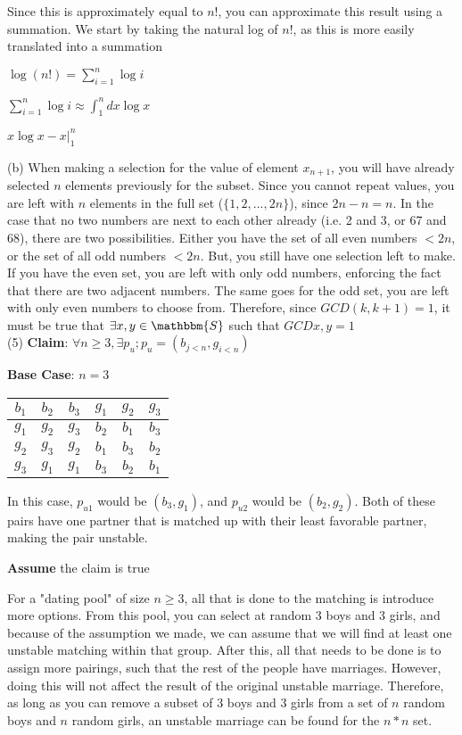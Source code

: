 \documentclass[]{article}
\begin{document}
Since this is approximately equal to $n!$, you can approximate this result using a summation.
We start by taking the natural log of $n!$, as this is more easily translated into a summation

$\log(n!) = \sum_{i = 1}^{n}{\log i}$

$\sum_{i = 1}^{n}{\log i} \approx \int_{1}^{n}{dx \log x}$

$x \log x - x | ^{n} _{1}$

(b) When making a selection for the value of element $x_{n+1}$, you will have already selected $n$ elements previously for the subset. Since you cannot repeat values, you are left with $n$ elements in the full set ($\{1,2,...,2n\}$), since $2n-n = n$. In the case that no two numbers are next to each other already (i.e. 2 and 3, or 67 and 68), there are two possibilities. Either you have the set of all even numbers $ < 2n$, or the set of all odd numbers $ < 2n$. But, you still have one selection left to make. If you have the even set, you are left with only odd numbers, enforcing the fact that there are two adjacent numbers. The same goes for the odd set, you are left with only even numbers to choose from. Therefore, since $GCD(k, k+1) = 1$, it must be true that $\exists x, y \in \mathbbm{S}$ such that $GCD{x, y} = 1$ \\

\noindent (5) \textbf{Claim}: $\forall n \geq 3, \exists p_u; p_u = ( b_{j<n}, g_{i<n})$

\textbf{Base Case}: $n = 3$

\begin{tabular}{ c | c | c || c | c | c}
	$b_1$ & $b_2$ & $b_3$  & $g_1$ & $g_2$ & $g_3$\\ \hline
	$g_1$ & $g_2$ & $g_3$ & $b_2$ & $b_1$ & $b_3$ \\
	$g_2$ & $g_3$ & $g_2$ & $b_1$ & $b_3$ & $b_2$ \\
	$g_3$ & $g_1$ & $g_1$ & $b_3$ & $b_2$ & $b_1$ \\
\end{tabular}

In this case, $p_{u1}$ would be $(b_3, g_1)$, and $p_{u2}$ would be $(b_2, g_2)$. Both of these pairs have one partner that is matched up with their least favorable partner, making the pair unstable.

\textbf{Assume} the claim is true

For a "dating pool" of size $n \geq 3$, all that is done to the matching is introduce more options. From this pool, you can select at random 3 boys and 3 girls, and because of the assumption we made, we can assume that we will find at least one unstable matching within that group. After this, all that needs to be done is to assign more pairings, such that the rest of the people have marriages. However, doing this will not affect the result of the original unstable marriage. Therefore, as long as you can remove a subset of 3 boys and 3 girls from a set of $n$ random boys and $n$ random girls, an unstable marriage can be found for the $n*n$ set.
\end{document}
